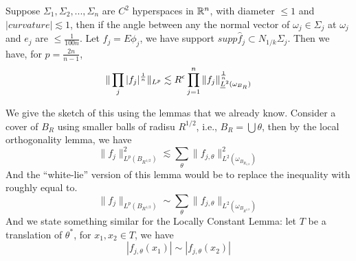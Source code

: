 \begin{theorem}
    Suppose $\Sigma_1, \Sigma_2, ..., \Sigma_n$ are $C^2$ hyperspaces in $\mathbb{R}^n$, with diameter $\leq 1$ and $|curvature|\lesssim 1$, then if the angle between any the normal vector of $\omega_j\in\Sigma_j$ at $\omega_j$ and $e_j$ are $\leq\frac{1}{100n}$. Let $f_j=E\phi_j$, we have support $supp\widehat{f}_j\subset N_{1/k}\Sigma_j$. Then we have, for $p=\frac{2n}{n-1}$, 
    \begin{equation*}
        \|\prod_j|f_j|^{\frac{1}{n}}\|_{L^p}\lesssim R^\epsilon\prod_{j=1}^n\|f_j\|_{\sout{L}^2(\omega_{B_R})}^{\frac{1}{n}}
    \end{equation*}
\end{theorem}
We give the sketch of this using the lemmas that we already know. Consider a cover of $B_R$ using smaller balls of radisu $R^{1/2}$, i.e., $B_R=\bigcup\theta$, then by the local orthogonality lemma, we have
\begin{equation*}
    \|f_j\|_{L^p(B_{R^{1/2}})}^2\lesssim \sum_{\theta}\|f_{j,\theta}\|_{L^2(\omega_{B_{R_{1/2}}})}^2
\end{equation*}
And the ``white-lie'' version of this lemma would be to replace the inequality with roughly equal to.
\begin{equation*}
    \|f_j\|_{L^p(B_{R^{1/2}})}\sim\sum_\theta\|f_{j,\theta}\|_{L^2(\omega_{B_{R^{1/2}}})}
\end{equation*}
And we state something similar for the Locally Constant Lemma: let $T$ be a translation of $\theta^*$, for $x_1,x_2\in T$, we have
\begin{equation*}
    |f_{j,\theta}(x_1)|\sim|f_{j,\theta}(x_2)|
\end{equation*}

